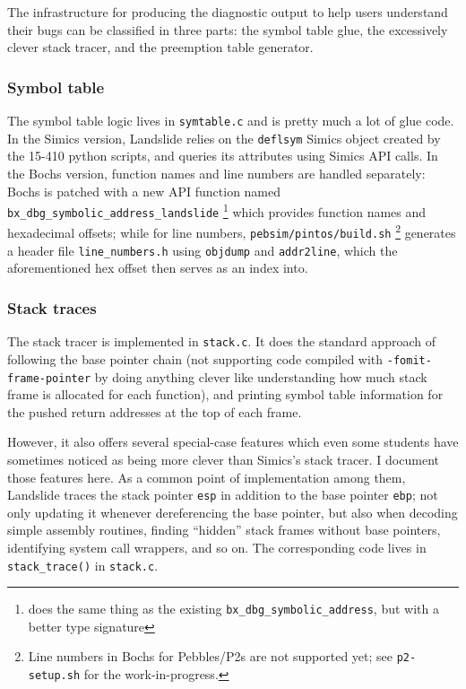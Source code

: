 The infrastructure for producing the diagnostic output to help users understand their bugs
can be classified in three parts:
the symbol table glue, the excessively clever stack tracer, and the preemption table generator.

\subsubsection{Symbol table}

The symbol table logic lives in {\tt symtable.c} and is pretty much a lot of glue code.
In the Simics version, Landslide relies on the {\tt deflsym} Simics object created by the 15-410 python scripts,
and queries its attributes using Simics API calls.
In the Bochs version, function names and line numbers are handled separately:
Bochs is patched with a new API function named {\tt bx\_dbg\_symbolic\_address\_landslide}%
\footnote{does the same thing as the existing {\tt bx\_dbg\_symbolic\_address}, but with a better type signature}
which provides function names and hexadecimal offsets;
while for line numbers, {\tt pebsim/pintos/build.sh}%
\footnote{Line numbers in Bochs for Pebbles/P2s are not supported yet; see {\tt p2-setup.sh} for the work-in-progress.}
generates a header file {\tt line\_numbers.h}
using {\tt objdump} and {\tt addr2line},
which the aforementioned hex offset then serves as an index into.

\subsubsection{Stack traces}

The stack tracer is implemented in {\tt stack.c}.
It does the standard approach of following the base pointer chain
(not supporting code compiled with {\tt -fomit-frame-pointer} by doing anything clever
like understanding how much stack frame is allocated for each function),
and printing symbol table information for the pushed return addresses at the top of each frame.

However, it also offers several special-case features
which even some students have sometimes noticed as being more clever than Simics's stack tracer.
I document those features here.
As a common point of implementation among them,
Landslide traces the stack pointer {\tt esp} in addition to the base pointer {\tt ebp};
not only updating it whenever dereferencing the base pointer,
but also when decoding simple assembly routines, finding ``hidden'' stack frames without base pointers,
identifying system call wrappers, and so on.
The corresponding code lives in {\tt stack\_trace()} in {\tt stack.c}.


